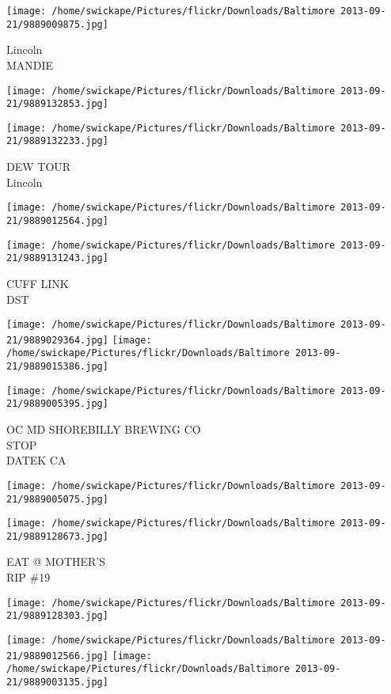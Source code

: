 \documentclass[10pt,letterpaper]{article}
\begin{document}
\vspace{0.25in}
\texttt{[image: /home/swickape/Pictures/flickr/Downloads/Baltimore 2013-09-21/9889009875.jpg]}

Lincoln\\
MANDIE
\pagebreak

\texttt{[image: /home/swickape/Pictures/flickr/Downloads/Baltimore 2013-09-21/9889132853.jpg]}

\vspace{0.25in}
\texttt{[image: /home/swickape/Pictures/flickr/Downloads/Baltimore 2013-09-21/9889132233.jpg]}

DEW TOUR\\
Lincoln
\pagebreak

\texttt{[image: /home/swickape/Pictures/flickr/Downloads/Baltimore 2013-09-21/9889012564.jpg]}

\vspace{0.25in}
\texttt{[image: /home/swickape/Pictures/flickr/Downloads/Baltimore 2013-09-21/9889131243.jpg]}

CUFF LINK\\
DST
\pagebreak

\texttt{[image: /home/swickape/Pictures/flickr/Downloads/Baltimore 2013-09-21/9889029364.jpg]}
\texttt{[image: /home/swickape/Pictures/flickr/Downloads/Baltimore 2013-09-21/9889015386.jpg]}

\vspace{0.25in}
\texttt{[image: /home/swickape/Pictures/flickr/Downloads/Baltimore 2013-09-21/9889005395.jpg]}

OC MD SHOREBILLY BREWING CO\\
STOP\\
DATEK CA
\pagebreak

\texttt{[image: /home/swickape/Pictures/flickr/Downloads/Baltimore 2013-09-21/9889005075.jpg]}

\vspace{0.25in}
\texttt{[image: /home/swickape/Pictures/flickr/Downloads/Baltimore 2013-09-21/9889128673.jpg]}

EAT @ MOTHER'S\\
RIP \#19
\pagebreak

\texttt{[image: /home/swickape/Pictures/flickr/Downloads/Baltimore 2013-09-21/9889128303.jpg]}

\vspace{0.25in}
\texttt{[image: /home/swickape/Pictures/flickr/Downloads/Baltimore 2013-09-21/9889012566.jpg]}
\texttt{[image: /home/swickape/Pictures/flickr/Downloads/Baltimore 2013-09-21/9889003135.jpg]}
\end{document}
